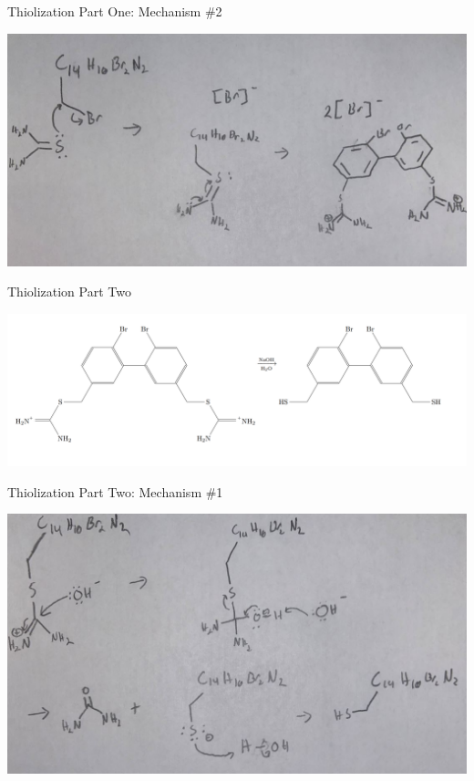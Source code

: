 \documentclass[notes]{beamer}
\begin{document}
\begin{frame}{Thiolization Part One: Mechanism \#2}
\begin{center}
    \includegraphics[scale=.4]{thiolization_part_one_two.JPG}
\end{center}
\end{frame}

\begin{frame}{Thiolization Part Two}
\begin{center}
    \includegraphics[scale=.35]{thiolization_part_two_overall.PNG}
\end{center}
\end{frame}

\begin{frame}{Thiolization Part Two: Mechanism \#1}
\begin{center}
    \includegraphics[scale=.4]{thiolization_part_two_one.JPG}
\end{center}
\end{frame}
\end{document}
